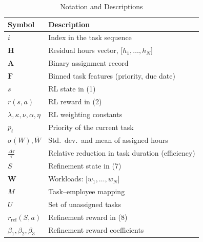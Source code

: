 \documentclass[%
aip,
cp,  %
amsmath,amssymb,
reprint,%
]{revtex4-2}
\begin{document}
	\begin{table}[!hb]
		\caption{\label{tab:notation}Notation and Descriptions}
		\begin{ruledtabular}
			\begin{tabular}{ll}
				\textbf{Symbol}                  & \textbf{Description}                                   \\
				\hline
				$i$                              & Index in the task sequence                             \\
				$\mathbf{H}$                     & Residual hours vector, $\bigl[h_{1},\dots,h_{N}\bigr]$ \\
				$\mathbf{A}$                     & Binary assignment record                               \\
				$\mathbf{F}$                     & Binned task features (priority, due date)              \\
				$s$                              & RL state in (1)                                        \\
				$r(s,a)$                         & RL reward in (2)                                       \\
				$\lambda,\kappa,\nu,\alpha,\eta$ & RL weighting constants                                 \\
				$p_{t}$                          & Priority of the current task                           \\
				$\sigma(W), \overline{W}$        & Std.\ dev.\ and mean of assigned hours                 \\
				$\tfrac{\Delta\tau}{\tau}$       & Relative reduction in task duration (efficiency)       \\
				$S$                              & Refinement state in (7)                                \\
				$\mathbf{W}$                     & Workloads: $\bigl[w_{1},\dots,w_{N}\bigr]$             \\
				$M$                              & Task--employee mapping                                 \\
				$U$                              & Set of unassigned tasks                                \\
				$r_{\text{ref}}(S,a)$            & Refinement reward in (8)                               \\
				$\beta_{1},\beta_{2},\beta_{3}$  & Refinement reward coefficients                         \\
			\end{tabular}
		\end{ruledtabular}
	\end{table}
	
\end{document}
